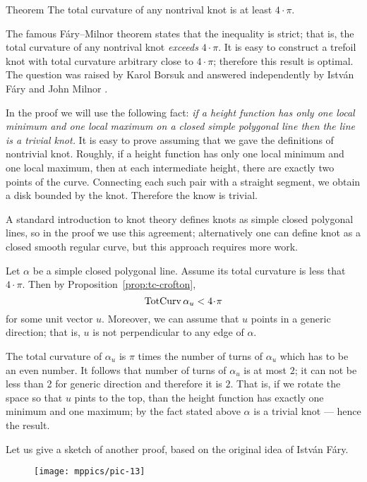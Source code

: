 \begin{thm}{Theorem}
The total curvature of any nontrival knot is at least $4\cdot\pi$. 
\end{thm}

The famous F\'ary--Milnor theorem states that the inequality is strict;
that is, the total curvature of any nontrival knot \emph{exceeds} $4\cdot\pi$.
It is easy to construct a trefoil knot with total curvature arbitrary close to $4\cdot\pi$;
therefore this result is optimal.
The question was raised by Karol Borsuk \cite{borsuk} and answered independently by Istv\'an F\'ary and John Milnor \cite{fary, milnor}. 

In the proof we will use the following fact: \emph{if a height function has only one local minimum and one local maximum on a closed simple polygonal line then the line is a trivial knot.}
It is easy to prove assuming that we gave the definitions of nontrivial knot.
Roughly, if a height function has only one local minimum and one local maximum, then at each intermediate height, there are
exactly two points of the curve.
Connecting each such pair with a straight segment, we obtain a disk bounded by the knot.
Therefore the know is trivial.


A standard introduction to knot theory defines knots as simple closed polygonal lines, so in the proof we use this agreement; alternatively one can define knot as a closed smooth regular curve, but this approach requires more work.

Let $\alpha$ be a simple closed polygonal line.
Assume its total curvature is less that $4\cdot\pi$.
Then by Proposition~\ref{prop:tc-crofton}, 
\[\tc\alpha_u<4\cdot\pi\]
for some unit vector $u$.
Moreover, we can assume that $u$ points in a generic direction;
that is, $u$ is not perpendicular to any edge of $\alpha$.

The total curvature of $\alpha_u$ is $\pi$ times the number of turns of $\alpha_u$
which has to be an even number.
It follows that number of turns of $\alpha_u$ is at most $2$;
it can not be less than 2 for generic direction and therefore it is $2$.
That is, if we rotate the space so that $u$ pints to the top,
than the height function has exactly one minimum and one maximum;
by the fact stated above $\alpha$ is a trivial knot --- hence the result.
\qeds

Let us give a sketch of another proof, based on the original idea of Istv\'an F\'ary.

\begin{wrapfigure}{r}{30 mm}
\vskip-0mm
\centering
\texttt{[image: mppics/pic-13]}
\vskip0mm
\end{wrapfigure}

